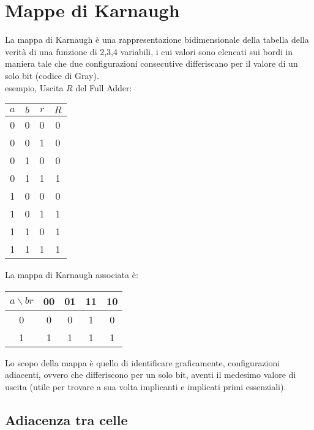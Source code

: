 \documentclass{subfiles}
\begin{document}
\section{Mappe di Karnaugh}

La mappa di Karnaugh è una rappresentazione bidimensionale della tabella della verità di una funzione di 2,3,4 variabili,
i cui valori sono elencati sui bordi in maniera tale che due configurazioni consecutive differiscano per il valore di un solo bit (codice di Gray).\\

\noindent
esempio, Uscita $R$ del Full Adder:

\begin{center}
\begin{tabular}{ |c|c|c|c| }
\hline
$a$ & $b$ & $r$ & $R$ \\
\hline
\hline
0 & 0 & 0 & 0 \\
0 & 0 & 1 & 0 \\
0 & 1 & 0 & 0 \\
0 & 1 & 1 & 1 \\
1 & 0 & 0 & 0 \\
1 & 0 & 1 & 1 \\
1 & 1 & 0 & 1 \\
1 & 1 & 1 & 1 \\
\hline
\end{tabular}
\end{center}

\noindent
La mappa di Karnaugh associata è:

\begin{center}
\begin{tabular}{ |c|c|c|c|c| }
\hline
$a \backslash br$ & 00 & 01 & 11 & 10 \\
\hline
\hline
0 & 0 & 0 & 1 & 0 \\
1 & 1 & 1 & 1 & 1 \\
\hline
\end{tabular}
\end{center}

\noindent
Lo scopo della mappa è quello di identificare graficamente, configurazioni adiacenti,
ovvero che differiscono per un solo bit, aventi il medesimo valore di uscita
(utile per trovare a sua volta implicanti e implicati primi essenziali).

\subsection{Adiacenza tra celle}
\end{document}
